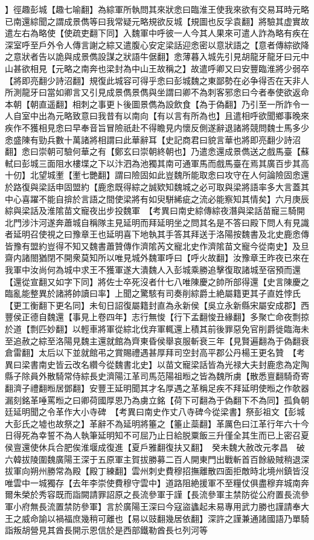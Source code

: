 】徑趣彭城【趣七喻翻】為綜軍所執問其來狀悆曰臨淮王使我來欲有交易耳時元略已南還綜聞之謂成景儁等曰我常疑元略規欲反城【規圖也反孚袁翻】將驗其虚實故遣左右為略使【使疏吏翻下同】入魏軍中呼彼一人今其人果來可遣人詐為略有疾在深室呼至戶外令人傳言謝之綜又遣腹心安定梁話迎悆密以意狀語之【意者傳綜欲降之意狀者告以詭與成景儁設謀之狀語牛倨翻】悆薄暮入城先引見胡龍牙龍牙曰元中山甚欲相見【元略之南奔也梁封為中山王故稱之】故遣呼卿又曰安豐臨淮將少弱卒【將即亮翻少詩沼翻】規復此城容可得乎悆曰彭城魏之東鄙勢在必争得否在天非人所測龍牙曰當如卿言又引見成景儁景儁與坐謂曰卿不為刺客邪悆曰今者奉使欲返命本朝【朝直遥翻】相刺之事更卜後圖景儁為設飲食【為于偽翻】乃引至一所詐令一人自室中出為元略致意曰我昔有以南向【有以言有所為也】且遣相呼欲聞鄉事晚來疾作不獲相見悆曰早奉音旨冒險祇赴不得瞻見内懷反側遂辭退諸將競問魏士馬多少悆盛陳有勁兵數十萬諸將相謂曰此華辭耳【史記商君曰貌言華也將即亮翻少詩沼翻】悆曰崇朝可驗何華之有【鄭玄曰崇朝終朝也】乃遣悆還成景儁送之戲馬臺【蘇軾曰彭城三面阻水樓堞之下以汴泗為池獨其南可通軍馬而戲馬臺在焉其廣百步其高十仞】北望城壍【壍七艷翻】謂曰險固如此豈魏所能取悆曰攻守在人何論險固悆還於路復與梁話申固盟約【鹿悆既得綜之誠欵知魏城之必可取與梁將語率多大言蓋其中心喜躍不能自揜於言語之間使梁將有如臾駢絺疵之流必能察知其情矣】六月庚辰綜與梁話及淮隂苗文寵夜出步投魏軍　【考異曰南史綜傳綜夜潛與梁話苗寵三騎開北門涉汴河遂奔蕭城自稱隊主見延明而拜延明坐之問其名是不答曰殿下問人有見識者延明召使視之曰豫章王也延明喜下地執其手答其拜送于洛陽按魏書及北史鹿悆傳皆豫有盟約豈得不知又魏書蕭贊傳作濟隂芮文寵北史作濟隂苗文寵今從南史】及旦齋内諸閤猶閉不開衆莫知所以唯見城外魏軍呼曰【呼火故翻】汝豫章王昨夜已來在我軍中汝尚何為城中求王不獲軍遂大潰魏人入彭城乘勝追擊復取諸城至宿預而還【還從宣翻又如字下同】將佐士卒死沒者什七八唯陳慶之帥所部得還【史言陳慶之臨亂能整異於諸將帥讀曰率】上聞之驚駭有司奏削綜爵土絶屬籍更其子直姓悖氏【更工衡翻下更名同】未旬日詔復屬籍封直為永新侯【吳立永新縣宋屬安成郡】西豐侯正德自魏還【事見上卷四年】志行無悛【行下孟翻悛丑緣翻】多聚亡命夜剽掠於道【剽匹妙翻】以輕車將軍從綜北伐弃軍輒還上積其前後罪惡免官削爵徙臨海未至追赦之綜至洛陽見魏主還就館為齊東昏侯舉哀服斬衰三年【見賢遍翻為于偽翻衰倉雷翻】太后以下並就館弔之賞賜禮遇甚厚拜司空封高平郡公丹楊王更名贊　【考異曰梁書南史皆云改名纘今從魏書北史】以苗文寵梁話皆為光禄大夫封鹿悆為定陶縣子除員外散騎常侍綜長史濟陽江革司馬范陽祖暅之皆為魏所虜【散悉亶翻騎奇寄翻濟子禮翻暅居鄧翻】安豐王延明聞其才名厚遇之革稱足疾不拜延明使暅之作欹器漏刻銘革唾罵暅之曰卿荷國厚恩乃為虜立銘【荷下可翻為于偽翻下不為同】孤負朝廷延明聞之令革作大小寺碑　【考異曰南史作丈八寺碑今從梁書】祭彭祖文【彭城大彭氏之墟也故祭之】革辭不為延明將箠之【箠止蘂翻】革厲色曰江革行年六十今日得死為幸誓不為人執筆延明知不可屈乃止日給脱粟飯三升僅全其生而已上密召夏侯亶還使休兵合肥俟淮堰成復進【夏戶雅翻復扶又翻】　癸未魏大赦改元孝昌　破六韓拔陵圍魏廣陽王深于五原軍主賀拔勝募二百人開東門出戰斬首百餘級賊稍退深拔軍向朔州勝常為殿【殿丁練翻】雲州刺史費穆招撫離散四面拒敵時北境州鎮皆沒唯雲中一城獨存【去年李崇使費穆守雲中】道路阻絶援軍不至糧仗俱盡穆弃城南奔爾朱榮於秀容既而詣闕請罪詔原之長流參軍于謹【長流參軍主禁防從公府置長流參軍小府無長流置禁防參軍】言於廣陽王深曰今寇盜蠭起未易專用武力勝也謹請奉大王之威命諭以禍福庶幾稍可離也【易以豉翻幾居依翻】深許之謹兼通諸國語乃單騎詣叛胡營見其酋長開示恩信於是西部鐵勒酋長乜列河等